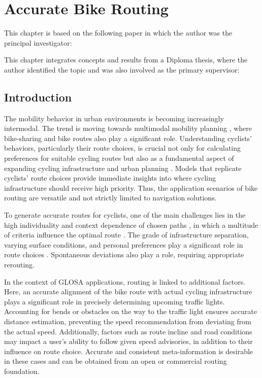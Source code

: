 \chapter{Accurate Bike Routing}\label{ch:routing}

\begin{Summary}
This chapter is based on the following paper in which the author was the principal investigator:

\cite{matthes2023accurate} 

This chapter integrates concepts and results from a Diploma thesis, where the author identified the topic and was also involved as the primary supervisor:

\cite{lorenz_2022} 
\end{Summary}

\section{Introduction}

The mobility behavior in urban environments is becoming increasingly intermodal. The trend is moving towards multimodal mobility planning \cite{park_framework_2023}, where bike-sharing and bike routes also play a significant role. Understanding cyclists' behaviors, particularly their route choices, is crucial not only for calculating preferences for suitable cycling routes but also as a fundamental aspect of expanding cycling infrastructure and urban planning \cite{zielstra_comparative_2011, huber_modelling_2021}. Models that replicate cyclists' route choices provide immediate insights into where cycling infrastructure should receive high priority. Thus, the application scenarios of bike routing are versatile and not strictly limited to navigation solutions.

To generate accurate routes for cyclists, one of the main challenges lies in the high individuality and context dependence of chosen paths \cite{dill_revisiting_2016, schleinitz_german_2017, misra_modeling_2018}, in which a multitude of criteria influence the optimal route \cite{song_exploring_2014, arellana_developing_2020}. The grade of infrastructure separation, varying surface conditions, and personal preferences play a significant role in route choices \cite{hardinghaus_attractive_2022}. Spontaneous deviations also play a role, requiring appropriate rerouting.

In the context of GLOSA applications, routing is linked to additional factors. Here, an accurate alignment of the bike route with actual cycling infrastructure plays a significant role in precisely determining upcoming traffic lights. Accounting for bends or obstacles on the way to the traffic light ensures accurate distance estimation, preventing the speed recommendation from deviating from the actual speed. Additionally, factors such as route incline and road conditions may impact a user's ability to follow given speed advisories, in addition to their influence on route choice. Accurate and consistent meta-information is desirable in these cases and can be obtained from an open or commercial routing foundation.


